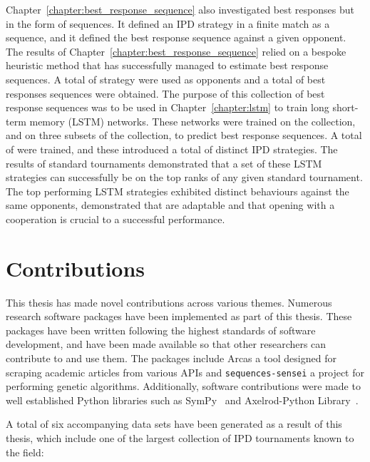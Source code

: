 Chapter~\ref{chapter:best_response_sequence} also investigated best responses
but in the form of sequences. It defined an IPD strategy in a finite match as
a sequence, and it defined the best response sequence against a given opponent.
The results of Chapter~\ref{chapter:best_response_sequence} relied on a bespoke
heuristic method that has successfully managed to estimate best response
sequences. A total of \numberofstrategiesbestsequences strategy were used
as opponents and a total of \totalsequences best responses sequences
were obtained. The purpose of this collection of best response sequences
was to be used in Chapter~\ref{chapter:lstm} to train long short-term
memory (LSTM) networks. These networks were trained on the collection, and on
three subsets of the collection, to predict best response sequences. A total
of \lstmnetworks were trained, and these introduced a total of \lstmstrategies
distinct IPD strategies. The results of \metatournamentslstm standard
tournaments demonstrated that a set of these LSTM strategies can successfully be
on the top ranks of any given standard tournament. The top performing LSTM
strategies exhibited distinct behaviours against the same opponents,
demonstrated that are adaptable and that opening with a cooperation is crucial
to a successful performance.

\section{Contributions}

This thesis has made novel contributions across various themes. Numerous
research software packages have been implemented as part of this thesis. These
packages have been written following the highest standards of software
development, and have been made available so that other researchers can
contribute to and use them. The packages include Arcas a tool designed for
scraping academic articles from various APIs and
\texttt{sequences-sensei} a project for performing genetic
algorithms. Additionally, software contributions were made to well established
Python libraries such as SymPy~\cite{sympy} and Axelrod-Python
Library~\cite{axelrodproject}.

A total of six accompanying data sets have been generated as a result of this thesis,
which include one of the largest collection of IPD
tournaments known to the field:

